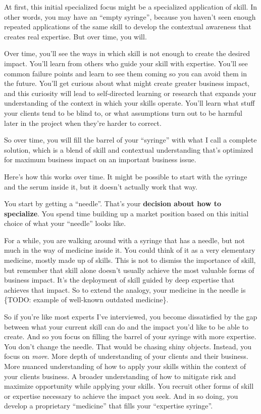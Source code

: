 At first, this initial specialized focus might be a specialized application of skill. In other words, you may have an ``empty syringe'', because you haven't seen enough repeated applications of the same skill to develop the contextual awareness that creates real expertise. But over time, you will.

Over time, you'll see the ways in which skill is not enough to create the desired impact. You'll learn from others who guide your skill with expertise. You'll see common failure points and learn to see them coming so you can avoid them in the future. You'll get curious about what might create greater business impact, and this curiosity will lead to self-directed learning or research that expands your understanding of the context in which your skills operate. You'll learn what stuff your clients tend to be blind to, or what assumptions turn out to be harmful later in the project when they're harder to correct.

So over time, you will fill the barrel of your ``syringe'' with what I call a complete solution, which is a blend of skill and contextual understanding that's optimized for maximum business impact on an important business issue.

Here's how this works over time. It might be possible to start with the syringe and the serum inside it, but it doesn’t actually work that way.

You start by getting a ``needle''. That's your \textbf{decision about how to specialize}. You spend time building up a market position based on this initial choice of what your ``needle'' looks like.

For a while, you are walking around with a syringe that has a needle, but not much in the way of medicine inside it. You could think of it as a very elementary medicine, mostly made up of skills. This is not to dismiss the importance of skill, but remember that skill alone doesn't usually achieve the most valuable forms of business impact. It's the deployment of skill guided by deep expertise that achieves that impact. So to extend the analogy, your medicine in the needle is \{TODO: example of well-known outdated medicine\}.

So if you're like most experts I've interviewed, you become dissatisfied by the gap between what your current skill can do and the impact you'd like to be able to create. And so you focus on filling the barrel of your syringe with more expertise. You don't change the needle. That would be chasing shiny objects. Instead, you focus on \emph{more}. More depth of understanding of your clients and their business. More nuanced understanding of how to apply your skills within the context of your clients business. A broader understanding of how to mitigate risk and maximize opportunity while applying your skills. You recruit other forms of skill or expertise necessary to achieve the impact you seek. And in so doing, you develop a proprietary ``medicine'' that fills your ``expertise syringe''.

